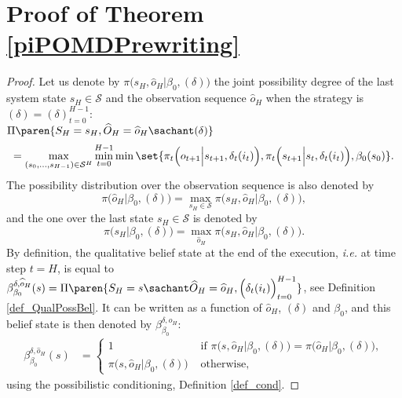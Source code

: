 









\section{Proof of Theorem \ref{piPOMDPrewriting}}

\begin{proof}
Let us denote by $\pi \Big( s_H, \widehat{o}_H  \Big\vert \beta_0, (\delta) \Big)$
the joint possibility degree of the last system state $s_H \in \mathcal{S}$
and the observation sequence $\widehat{o}_H$ when the strategy is $(\delta) = (\delta)_{t=0}^{H-1}$:\\
$\Pi \paren{ S_H = s_H, \widehat{O}_H = \widehat{o}_H  \sachant (\delta) }$
\[  =\max_{(s_0,\ldots,s_{H-1}) \in \mathcal{S}^H} \min_{t=0}^{H-1} \min \set{ \pi_t \Big( o_{t+1} \Big\vert s_{t+1}, \delta_t(i_t) \Big), \pi_t \Big( s_{t+1} \Big\vert s_t,\delta_t(i_t) \Big), \beta_0(s_0)}. \]
The possibility distribution over the observation sequence is also denoted by
\[ \pi \Big( \widehat{o}_H  \Big\vert \beta_0, (\delta) \Big) = \max_{s_H \in \mathcal{S}} \pi \Big( s_H, \widehat{o}_H  \Big\vert \beta_0, (\delta) \Big), \] 
and the one over the last state $s_H \in \mathcal{S}$ is denoted by
\[ \pi \Big( s_H \Big\vert \beta_0, (\delta) \Big) 
= \max_{\widehat{o}_H} \pi \Big( s_H, \widehat{o}_H  \Big\vert \beta_0, (\delta) \Big). \]
By definition, the qualitative belief state at the end of the execution, \textit{i.e.} at time step $t=H$,
is equal to $\beta^{\delta,\widehat{o}_H}_{\beta_0}(s) = \Pi \paren{ S_H = s \sachant \widehat{O}_H = \widehat{o}_H , \Big(\delta_t(i_t)\Big)_{t=0}^{H-1} }$,
see Definition \ref{def_QualPossBel}. 
It can be written as a function of $\widehat{o}_H$, $(\delta)$ and $\beta_0$,
and this belief state is then denoted by $\beta^{\delta,\widehat{o}_H}_{\beta_0}$:
\begin{align*}
\beta^{\delta,\widehat{o}_H}_{\beta_0}(s) &= \left\{ \begin{array}{ccc} 1 & \mbox{ if } \pi \Big( s, \widehat{o}_H \Big\vert \beta_0, (\delta) \Big) =   
\pi \Big( \widehat{o}_H \Big\vert \beta_0, (\delta) \Big), \\
\pi \Big( s, \widehat{o}_H \Big\vert \beta_0, (\delta) \Big) & \mbox{ otherwise, }
\end{array} \right.
\end{align*}
using the possibilistic conditioning, Definition \ref{def_cond}.


\end{proof}
